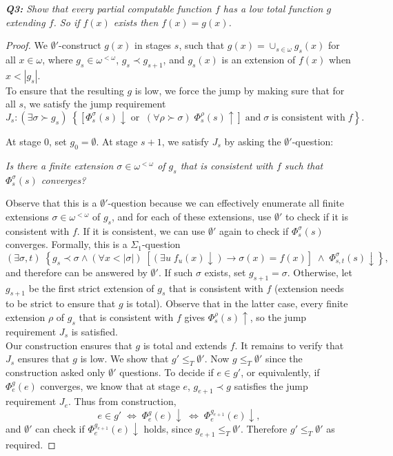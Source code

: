 \documentclass{article}
\begin{document}
\it \textbf{Q3:} Show that every partial computable function $f$ has a low
  total function $g$ extending $f$. So if $f(x)$ exists then $f(x)=g(x)$.

  \begin{proof}
    We $\emptyset'$-construct $g(x)$ in stages $s$, such that
    $g(x)=\cup_{s\in\omega} g_s(x)$ for all $x\in\omega$, where $g_s\in
    \omega^{<\omega}$, $g_s\prec g_{s+1}$, and $g_s(x)$ is an extension of
    $f(x)$ when $x<|g_s|$. \\

    To ensure that the resulting $g$ is low, we force the jump by
    making sure that for all $s$, we satisfy the jump requirement
    \[J_s: (\exists \sigma\succ g_s)\; \left\{ \left[
    \Phi_s^{\sigma}(s)\downarrow\; \text{or}\;\; (\forall
    \rho\succ\sigma)\; \Phi_s^{\rho}(s)\uparrow \right]\; \text{and}\;
    \sigma\; \text{is consistent with}\; f\right\}.\]

    At stage 0, set $g_0=\emptyset$. At stage $s+1$, we satisfy $J_s$ by
    asking the $\emptyset'$-question:
    \begin{center}
      \textit{Is there a finite extension $\sigma\in\omega^{<\omega}$ of
      $g_s$ that is consistent with $f$ such that $\Phi^\sigma_s(s)$
      converges?}
    \end{center}

    Observe that this is a $\emptyset'$-question because we can
    effectively enumerate all finite extensions
    $\sigma\in\omega^{<\omega}$ of $g_s$, and for each of these extensions,
    use $\emptyset'$ to check if it is consistent with $f$. If it is
    consistent, we can use $\emptyset'$ again to check if
    $\Phi^\sigma_s(s)$ converges. Formally, this is a $\Sigma_1$-question
    \[(\exists \sigma,t)\; \left\{ g_s\prec\sigma \wedge (\forall
    x<|\sigma|)\; \left[ (\exists u\; f_u(x)\downarrow)
    \rightarrow\sigma(x)=f(x) \right]\; \wedge\;
    \Phi^\sigma_{s,t}(s)\downarrow \right\},\]
    and therefore can be answered by $\emptyset'$. If such $\sigma$ exists,
    set $g_{s+1}=\sigma$. Otherwise, let $g_{s+1}$ be the first strict
    extension of $g_s$ that is consistent with $f$ (extension needs to be
    strict to ensure that $g$ is total). Observe that in the latter case,
    every finite extension $\rho$ of $g_s$ that is consistent with $f$
    gives $\Phi_s^\rho(s)\uparrow$, so the jump requirement $J_s$ is
    satisfied. \\

    Our construction ensures that $g$ is total and extends $f$. It remains
    to verify that $J_s$ ensures that $g$ is low. We show that
    $g'\leq_T\emptyset'$. Now $g\leq_T\emptyset'$ since the construction
    asked only $\emptyset'$ questions. To decide if $e\in g'$, or
    equivalently, if $\Phi_e^g(e)$ converges, we know that at stage $e$,
    $g_{e+1}\prec g$ satisfies the jump requirement $J_e$. Thus from
    construction, \[e\in g'\; \Leftrightarrow\; \Phi_e^g(e)\downarrow\;
    \Leftrightarrow\; \Phi_e^{g_{e+1}}(e)\downarrow,\] and $\emptyset'$ can
    check if $\Phi_e^{g_{e+1}}(e)\downarrow$ holds, since $g_{e+1}\leq_T
    \emptyset'$. Therefore $g'\leq_T\emptyset'$ as required.
  \end{proof}
\end{document}
